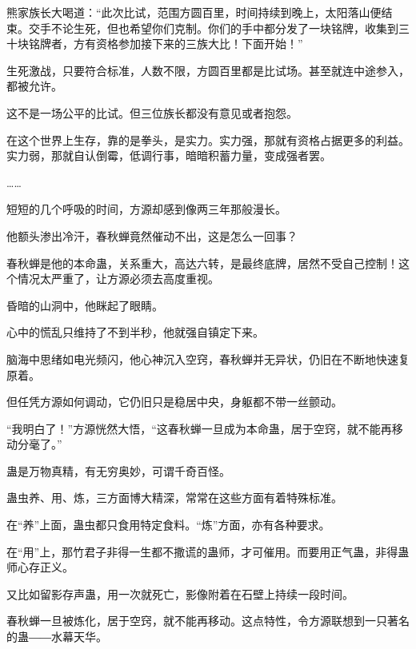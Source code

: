 \begin{this_body}
熊家族长大喝道：“此次比试，范围方圆百里，时间持续到晚上，太阳落山便结束。交手不论生死，但也希望你们克制。你们的手中都分发了一块铭牌，收集到三十块铭牌者，方有资格参加接下来的三族大比！下面开始！”

生死激战，只要符合标准，人数不限，方圆百里都是比试场。甚至就连中途参入，都被允许。

这不是一场公平的比试。但三位族长都没有意见或者抱怨。

在这个世界上生存，靠的是拳头，是实力。实力强，那就有资格占据更多的利益。实力弱，那就自认倒霉，低调行事，暗暗积蓄力量，变成强者罢。

……

短短的几个呼吸的时间，方源却感到像两三年那般漫长。

他额头渗出冷汗，春秋蝉竟然催动不出，这是怎么一回事？

春秋蝉是他的本命蛊，关系重大，高达六转，是最终底牌，居然不受自己控制！这个情况太严重了，让方源必须去高度重视。

昏暗的山洞中，他眯起了眼睛。

心中的慌乱只维持了不到半秒，他就强自镇定下来。

脑海中思绪如电光频闪，他心神沉入空窍，春秋蝉并无异状，仍旧在不断地快速复原着。

但任凭方源如何调动，它仍旧只是稳居中央，身躯都不带一丝颤动。

“我明白了！”方源恍然大悟，“这春秋蝉一旦成为本命蛊，居于空窍，就不能再移动分毫了。”

蛊是万物真精，有无穷奥妙，可谓千奇百怪。

蛊虫养、用、炼，三方面博大精深，常常在这些方面有着特殊标准。

在“养”上面，蛊虫都只食用特定食料。“炼”方面，亦有各种要求。

在“用”上，那竹君子非得一生都不撒谎的蛊师，才可催用。而要用正气蛊，非得蛊师心存正义。

又比如留影存声蛊，用一次就死亡，影像附着在石壁上持续一段时间。

春秋蝉一旦被炼化，居于空窍，就不能再移动。这点特性，令方源联想到一只著名的蛊――水幕天华。

\end{this_body}

